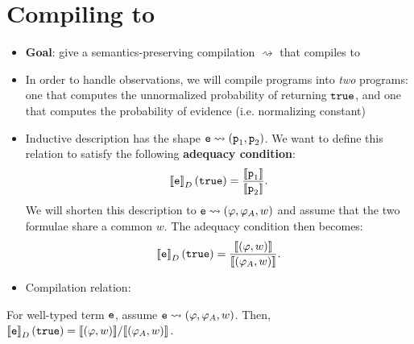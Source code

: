 \documentclass{tufte-handout}
\begin{document}
\section{Compiling \disc{} to \prop{}}
\begin{itemize}
  \item \textbf{Goal}: give a semantics-preserving compilation
  $\rightsquigarrow$ that compiles \disc{} to \prop{}
  \item In order to handle observations, we will compile \disc{} programs into 
  \emph{two} \prop{} programs: one that computes the unnormalized probability of 
  returning $\texttt{true}$, and one that computes the probability of evidence (i.e. normalizing constant)
  \item Inductive description has the shape $\texttt{e} \rightsquigarrow (\texttt{p}_1, \texttt{p}_2)$. We want to 
  define this relation to satisfy the following \textbf{adequacy condition}:
  \begin{align} 
    \left \llbracket {\texttt{e}} \right \rrbracket_D(\texttt{true}) = \frac{\left \llbracket {\texttt{p}_1} \right \rrbracket}{\left \llbracket {\texttt{p}_2} \right \rrbracket}.
  \end{align} 
  We will shorten this description to $\texttt{e} \rightsquigarrow
  (\varphi, \varphi_A, w)$ and assume that the two formulae share a common
  $w$. The adequacy condition then becomes:
  \begin{align} 
    \left \llbracket {\texttt{e}} \right \rrbracket_D(\texttt{true}) = \frac{\left \llbracket {(\varphi, w)} \right \rrbracket}{\left \llbracket {(\varphi_A, w)} \right \rrbracket}.
  \end{align} 
  \item Compilation relation:

\end{itemize}
\begin{theorem}[Adequacy]
  For well-typed term $\texttt{e}$,
  assume $\texttt{e} \rightsquigarrow (\varphi, \varphi_A, w)$. Then, 
  $\left \llbracket {\texttt{e}} \right \rrbracket_D(\texttt{true}) = {\left \llbracket {(\varphi, w)} \right \rrbracket} / {\left \llbracket {(\varphi_A, w)} \right \rrbracket}$.
\end{theorem}



\end{document}
